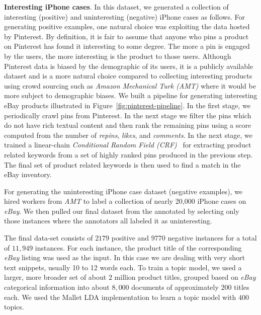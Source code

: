 {\bf Interesting iPhone cases}.
In this dataset, we generated a collection of interesting (positive) and uninteresting (negative) iPhone cases as follows. For generating positive examples, one natural choice was exploiting the data hosted by Pinterest. By definition, it is fair to assume that anyone who pins a product on Pinterest has found it interesting to some degree. The more a pin is engaged by the users, the more interesting is the product to those users. Although Pinterest data is biased by the demographic of its users, it is a publicly available dataset and is a more natural choice compared to collecting interesting products using crowd sourcing such as  {\em Amazon Mechanical Turk (AMT)} where it would be more subject to demographic biases. We built a pipeline for generating interesting eBay products illustrated in Figure~\ref{fig:pinterest-pipeline}.  In the first stage, we periodically crawl pins from Pinterest. In the next stage we filter the pins which do not have rich textual content and then rank the remaining pins using a score computed from the number of {\em repins}, {\em likes}, and {\em comments}. In the next stage, we trained a linear-chain {\em Conditional Random Field (CRF)}~\cite{Lafferty:2001:CRF:645530.655813} for extracting product related keywords from a set of highly ranked pins produced in the previous step. The final set of product related keywords  is then used to find a match in the eBay inventory. 

For generating the uninteresting iPhone case dataset (negative examples), we
hired workers from {\em AMT} to label a collection
of nearly 20,000 iPhone cases on {\em eBay}.  We then pulled our final dataset from the annotated by selecting only those instances where the annotators all labeled it as uninteresting. 

The final data-set consists of $2179$ positive and $9770$ negative instances
for a total of $11,949$ instances. For each instance, the product title of
the corresponding {\em eBay} listing was used as the input. In this case we are
dealing with very short text snippets, usually 10 to 12 words each. To
train a topic model, we used a larger, more broader set of about
$2$ million product titles, grouped based on {\em eBay} categorical information into about $8,000$
documents of approximately $200$ titles each. We used the Mallet LDA
implementation to learn a topic model with $400$ topics.


